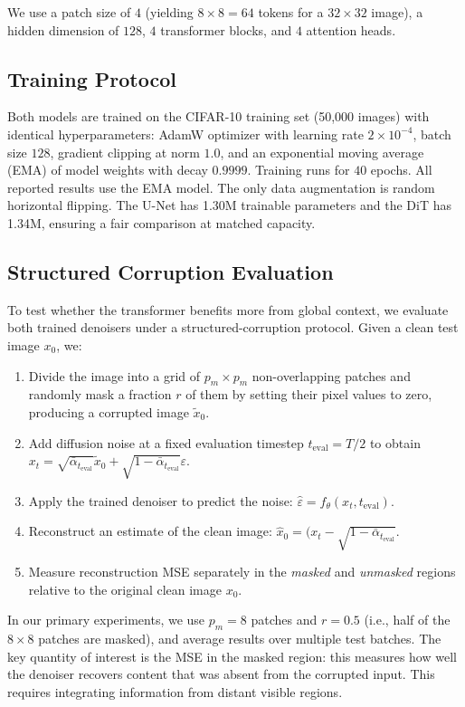 \documentclass{article}
\begin{document}
We use a patch size of $4$ (yielding $8\times 8=64$ tokens for a $32\times 32$ image), a hidden dimension of $128$, $4$ transformer blocks, and $4$ attention heads.

\subsection{Training Protocol}

Both models are trained on the CIFAR-10 training set (50,000 images) with identical hyperparameters: AdamW optimizer with learning rate $2\times 10^{-4}$, batch size $128$, gradient clipping at norm $1.0$, and an exponential moving average (EMA) of model weights with decay $0.9999$.
Training runs for $40$ epochs.
All reported results use the EMA model.
The only data augmentation is random horizontal flipping.
The U-Net has 1.30M trainable parameters and the DiT has 1.34M, ensuring a fair comparison at matched capacity.

\subsection{Structured Corruption Evaluation}

To test whether the transformer benefits more from global context, we evaluate both trained denoisers under a structured-corruption protocol.
Given a clean test image $x_0$, we: 
\begin{enumerate}
    \item Divide the image into a grid of $p_m\times p_m$ non-overlapping patches and randomly mask a fraction $r$ of them by setting their pixel values to zero, producing a corrupted image $\tilde x_0$.
    \item Add diffusion noise at a fixed evaluation timestep $t_{\text{eval}}=T/2$ to obtain $x_t=\sqrt{\bar\alpha_{t_\text{eval}}}\tilde x_0+\sqrt{1-\bar\alpha_{t_\text{eval}}}\varepsilon$.
    \item Apply the trained denoiser to predict the noise: $\hat\varepsilon=f_\theta(x_t,t_\text{eval})$.
    \item Reconstruct an estimate of the clean image: $\hat x_0=(x_t-\sqrt{1-\bar\alpha_{t_\text{eval}}}$.
    \item Measure reconstruction MSE separately in the \emph{masked} and \emph{unmasked} regions relative to the original clean image $x_0$.
\end{enumerate}
In our primary experiments, we use $p_m=8$ patches and $r=0.5$ (i.e., half of the $8\times 8$ patches are masked), and average results over multiple test batches.
The key quantity of interest is the MSE in the masked region: this measures how well the denoiser recovers content that was absent from the corrupted input. This requires integrating information from distant visible regions.
\end{document}
